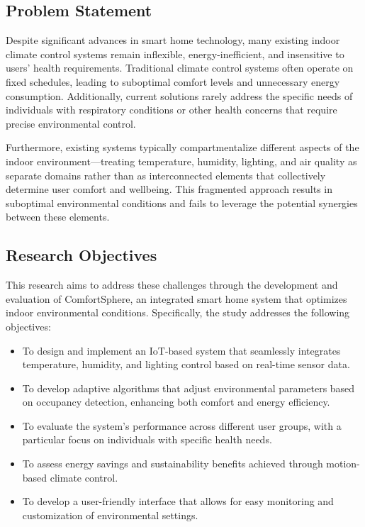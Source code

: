 \documentclass[a4paper]{scrartcl}
\begin{document}
    \subsection{Problem Statement}
    Despite significant advances in smart home technology, many existing indoor climate control systems remain inflexible, energy-inefficient, and insensitive to users' health requirements. Traditional climate control systems often operate on fixed schedules, leading to suboptimal comfort levels and unnecessary energy consumption. Additionally, current solutions rarely address the specific needs of individuals with respiratory conditions or other health concerns that require precise environmental control.
    
    Furthermore, existing systems typically compartmentalize different aspects of the indoor environment—treating temperature, humidity, lighting, and air quality as separate domains rather than as interconnected elements that collectively determine user comfort and wellbeing. This fragmented approach results in suboptimal environmental conditions and fails to leverage the potential synergies between these elements.
    
    \subsection{Research Objectives}
    This research aims to address these challenges through the development and evaluation of ComfortSphere, an integrated smart home system that optimizes indoor environmental conditions. Specifically, the study addresses the following objectives:
    
    \begin{itemize}
        \item To design and implement an IoT-based system that seamlessly integrates temperature, humidity, and lighting control based on real-time sensor data.
        \item To develop adaptive algorithms that adjust environmental parameters based on occupancy detection, enhancing both comfort and energy efficiency.
        \item To evaluate the system's performance across different user groups, with a particular focus on individuals with specific health needs.
        \item To assess energy savings and sustainability benefits achieved through motion-based climate control.
        \item To develop a user-friendly interface that allows for easy monitoring and customization of environmental settings.
    \end{itemize}
    
\end{document}
